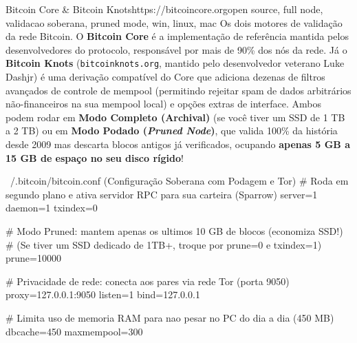 \documentclass{pousadaguide}
\begin{document}
\begin{ferramenta}[goat,logo=bitcoincore]{Bitcoin Core \& Bitcoin Knots}{https://bitcoincore.org}{open source, full node, validacao soberana, pruned mode, win, linux, mac}
Os dois motores de validação da rede Bitcoin. O \textbf{Bitcoin Core} é a implementação de referência mantida pelos desenvolvedores do protocolo, responsável por mais de 90\% dos nós da rede. Já o \textbf{Bitcoin Knots} (\texttt{bitcoinknots.org}, mantido pelo desenvolvedor veterano Luke Dashjr) é uma derivação compatível do Core que adiciona dezenas de filtros avançados de controle de mempool (permitindo rejeitar spam de dados arbitrários não-financeiros na sua mempool local) e opções extras de interface. Ambos podem rodar em \textbf{Modo Completo (Archival)} (se você tiver um SSD de 1 TB a 2 TB) ou em \textbf{Modo Podado (\emph{Pruned Node})}, que valida 100\% da história desde 2009 mas descarta blocos antigos já verificados, ocupando \textbf{apenas 5 GB a 15 GB de espaço no seu disco rígido}! 
\end{ferramenta}

\begin{codigo}[language=bash]{~/.bitcoin/bitcoin.conf (Configuração Soberana com Podagem e Tor)}
# Roda em segundo plano e ativa servidor RPC para sua carteira (Sparrow)
server=1
daemon=1
txindex=0

# Modo Pruned: mantem apenas os ultimos 10 GB de blocos (economiza SSD!)
# (Se tiver um SSD dedicado de 1TB+, troque por prune=0 e txindex=1)
prune=10000

# Privacidade de rede: conecta aos pares via rede Tor (porta 9050)
proxy=127.0.0.1:9050
listen=1
bind=127.0.0.1

# Limita uso de memoria RAM para nao pesar no PC do dia a dia (450 MB)
dbcache=450
maxmempool=300
\end{codigo}
\end{document}
